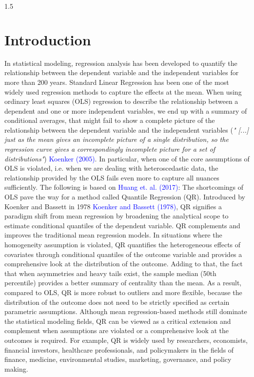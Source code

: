 \documentclass[conference]{IEEEtran}
\begin{document}
\begin{spacing}{1.5}
\section{\textbf{Introduction}}
In statistical modeling, regression analysis has been developed to quantify the relationship between the dependent variable and the independent variables for more than 200 years. Standard Linear Regression has been one of the most widely used regression methods to capture the effects at the mean. When using ordinary least squares (OLS) regression to describe the relationship between a dependent and one or more independent variables, we end up with a summary of conditional averages, that might fail to show a complete picture of the relationship between the dependent variable and the independent variables (\textit{" [...] just as the mean gives an incomplete picture of a single distribution, so the regression curve gives a correspondingly incomplete picture for a set of distributions"}) \textcolor{blue}{Koenker (2005)}. In particular, when one of the core assumptions of OLS is violated, i.e. when we are dealing with heteroscedastic data, the relationship provided by the OLS fails even more to capture all nuances sufficiently.
The following is based on  \textcolor{blue}{Huang et. al. (2017)}: The shortcomings of OLS pave the way for a method called Quantile Regression (QR). Introduced by Koenker and Bassett in 1978  \textcolor{blue}{Koenker and Bassett (1978)}, QR signifies a paradigm shift from mean regression by broadening the analytical scope to estimate conditional quantiles of the dependent variable.  QR complements and improves the traditional mean regression models. In situations where the homogeneity assumption is violated, QR quantifies the heterogeneous effects of covariates through conditional quantiles of the outcome variable and provides a comprehensive look at the distribution of the outcome. Adding to that, the fact that when asymmetries and heavy tails exist, the sample median (50th percentile) provides a better summary of centrality than the mean. As a result, compared to OLS, QR is more robust to outliers and more flexible, because the distribution of the outcome does not need to be strictly specified as certain parametric assumptions. Although mean regression-based methods still dominate the statistical modeling fields, QR can be viewed as a critical extension and complement when assumptions are violated or a comprehensive look at the outcomes is required. For example, QR is widely used by researchers, economists, financial investors, healthcare professionals, and policymakers in the fields of finance, medicine, environmental studies, marketing, governance, and policy making.


\end{spacing}
\end{document}
